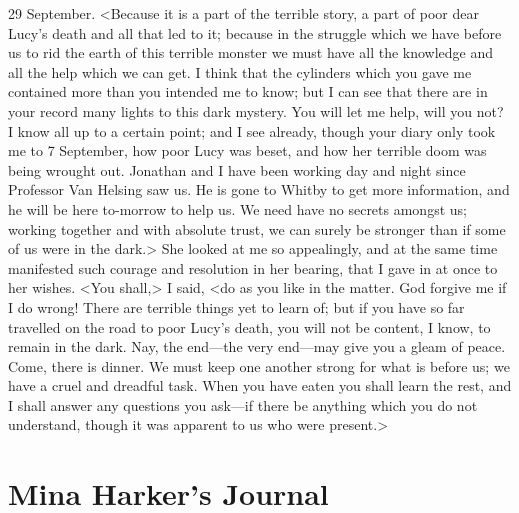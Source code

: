 \begin{diary}{29 September.}
<Because it is a part of the terrible story, a part of poor dear Lucy's death and all that led to it; because in the struggle which we have before us to rid the earth of this terrible monster we must have all the knowledge and all the help which we can get. I think that the cylinders which you gave me contained more than you intended me to know; but I can see that there are in your record many lights to this dark mystery. You will let me help, will you not? I know all up to a certain point; and I see already, though your diary only took me to 7 September, how poor Lucy was beset, and how her terrible doom was being wrought out. Jonathan and I have been working day and night since Professor Van Helsing saw us. He is gone to Whitby to get more information, and he will be here to-morrow to help us. We need have no secrets amongst us; working together and with absolute trust, we can surely be stronger than if some of us were in the dark.> She looked at me so appealingly, and at the same time manifested such courage and resolution in her bearing, that I gave in at once to her wishes. <You shall,> I said, <do as you like in the matter. God forgive me if I do wrong! There are terrible things yet to learn of; but if you have so far travelled on the road to poor Lucy's death, you will not be content, I know, to remain in the dark. Nay, the end—the very end—may give you a gleam of peace. Come, there is dinner. We must keep one another strong for what is before us; we have a cruel and dreadful task. When you have eaten you shall learn the rest, and I shall answer any questions you ask—if there be anything which you do not understand, though it was apparent to us who were present.>
\end{diary}

\section{Mina Harker's Journal}

